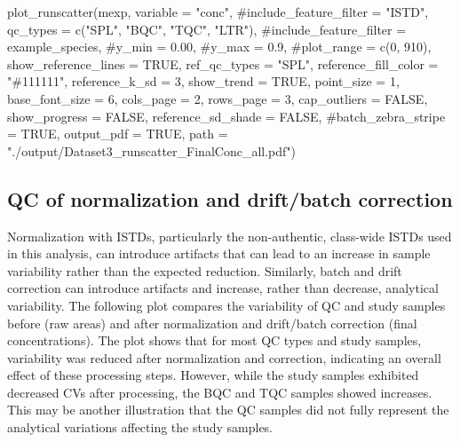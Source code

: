 \documentclass[
  letterpaper,
  DIV=11,
  numbers=noendperiod]{scrartcl}
\newenvironment{Shaded}{\begin{snugshade}}{\end{snugshade}}
\newcommand{\AttributeTok}[1]{\textcolor[rgb]{0.40,0.45,0.13}{#1}}
\newcommand{\CommentTok}[1]{\textcolor[rgb]{0.37,0.37,0.37}{#1}}
\newcommand{\ConstantTok}[1]{\textcolor[rgb]{0.56,0.35,0.01}{#1}}
\newcommand{\DecValTok}[1]{\textcolor[rgb]{0.68,0.00,0.00}{#1}}
\newcommand{\FunctionTok}[1]{\textcolor[rgb]{0.28,0.35,0.67}{#1}}
\newcommand{\NormalTok}[1]{\textcolor[rgb]{0.00,0.23,0.31}{#1}}
\newcommand{\StringTok}[1]{\textcolor[rgb]{0.13,0.47,0.30}{#1}}
\begin{document}
\begin{Shaded}
\begin{Highlighting}[]
\FunctionTok{plot\_runscatter}\NormalTok{(mexp, }\AttributeTok{variable =} \StringTok{"conc"}\NormalTok{, }
                \CommentTok{\#include\_feature\_filter = "ISTD", }
                \AttributeTok{qc\_types =} \FunctionTok{c}\NormalTok{(}\StringTok{"SPL"}\NormalTok{, }\StringTok{"BQC"}\NormalTok{, }\StringTok{"TQC"}\NormalTok{, }\StringTok{"LTR"}\NormalTok{), }
                \CommentTok{\#include\_feature\_filter = example\_species,}
                \CommentTok{\#y\_min = 0.00,}
                \CommentTok{\#y\_max = 0.9,}
                \CommentTok{\#plot\_range = c(0, 910), }
                \AttributeTok{show\_reference\_lines =} \ConstantTok{TRUE}\NormalTok{,}
                \AttributeTok{ref\_qc\_types =} \StringTok{"SPL"}\NormalTok{,}
                \AttributeTok{reference\_fill\_color =} \StringTok{"\#111111"}\NormalTok{,}
                \AttributeTok{reference\_k\_sd =} \DecValTok{3}\NormalTok{,}
                \AttributeTok{show\_trend =} \ConstantTok{TRUE}\NormalTok{,}
                \AttributeTok{point\_size =} \DecValTok{1}\NormalTok{,}
                \AttributeTok{base\_font\_size =} \DecValTok{6}\NormalTok{,}
                \AttributeTok{cols\_page =} \DecValTok{2}\NormalTok{,}
                \AttributeTok{rows\_page =} \DecValTok{3}\NormalTok{,}
                \AttributeTok{cap\_outliers =} \ConstantTok{FALSE}\NormalTok{,}
                \AttributeTok{show\_progress =} \ConstantTok{FALSE}\NormalTok{,}
                \AttributeTok{reference\_sd\_shade =} \ConstantTok{FALSE}\NormalTok{,}
                \CommentTok{\#batch\_zebra\_stripe = TRUE, }
                \AttributeTok{output\_pdf =} \ConstantTok{TRUE}\NormalTok{,}
                \AttributeTok{path =} \StringTok{"./output/Dataset3\_runscatter\_FinalConc\_all.pdf"}\NormalTok{)}
\end{Highlighting}
\end{Shaded}

\subsection{QC of normalization and drift/batch
correction}\label{qc-of-normalization-and-driftbatch-correction}

Normalization with ISTDs, particularly the non-authentic, class-wide
ISTDs used in this analysis, can introduce artifacts that can lead to an
increase in sample variability rather than the expected reduction.
Similarly, batch and drift correction can introduce artifacts and
increase, rather than decrease, analytical variability. The following
plot compares the variability of QC and study samples before (raw areas)
and after normalization and drift/batch correction (final
concentrations). The plot shows that for most QC types and study
samples, variability was reduced after normalization and correction,
indicating an overall effect of these processing steps. However, while
the study samples exhibited decreased CVs after processing, the BQC and
TQC samples showed increases. This may be another illustration that the
QC samples did not fully represent the analytical variations affecting
the study samples.
\end{document}
